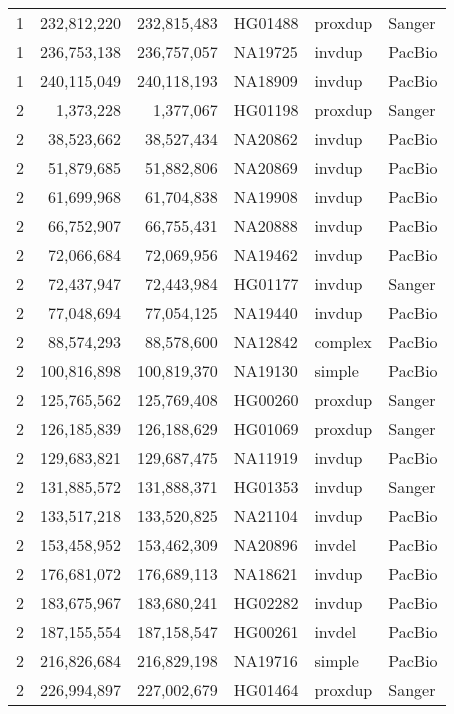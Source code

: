 {\begin{longtable}{rrrlll}
    1   & 232,812,220 & 232,815,483 & HG01488 & proxdup & Sanger  \\
    1   & 236,753,138 & 236,757,057 & NA19725 & invdup  & PacBio  \\
    1   & 240,115,049 & 240,118,193 & NA18909 & invdup  & PacBio  \\
    2   & 1,373,228   & 1,377,067   & HG01198 & proxdup & Sanger  \\
    2   & 38,523,662  & 38,527,434  & NA20862 & invdup  & PacBio  \\
    2   & 51,879,685  & 51,882,806  & NA20869 & invdup  & PacBio  \\
    2   & 61,699,968  & 61,704,838  & NA19908 & invdup  & PacBio  \\
    2   & 66,752,907  & 66,755,431  & NA20888 & invdup  & PacBio  \\
    2   & 72,066,684  & 72,069,956  & NA19462 & invdup  & PacBio  \\
    2   & 72,437,947  & 72,443,984  & HG01177 & invdup  & Sanger  \\
    2   & 77,048,694  & 77,054,125  & NA19440 & invdup  & PacBio  \\
    2   & 88,574,293  & 88,578,600  & NA12842 & complex & PacBio  \\
    2   & 100,816,898 & 100,819,370 & NA19130 & simple  & PacBio  \\
    2   & 125,765,562 & 125,769,408 & HG00260 & proxdup & Sanger  \\
    2   & 126,185,839 & 126,188,629 & HG01069 & proxdup & Sanger  \\
    2   & 129,683,821 & 129,687,475 & NA11919 & invdup  & PacBio  \\
    2   & 131,885,572 & 131,888,371 & HG01353 & invdup  & Sanger  \\
    2   & 133,517,218 & 133,520,825 & NA21104 & invdup  & PacBio  \\
    2   & 153,458,952 & 153,462,309 & NA20896 & invdel  & PacBio  \\
    2   & 176,681,072 & 176,689,113 & NA18621 & invdup  & PacBio  \\
    2   & 183,675,967 & 183,680,241 & HG02282 & invdup  & PacBio  \\
    2   & 187,155,554 & 187,158,547 & HG00261 & invdel  & PacBio  \\
    2   & 216,826,684 & 216,829,198 & NA19716 & simple  & PacBio  \\
    2   & 226,994,897 & 227,002,679 & HG01464 & proxdup & Sanger  \\

\end{longtable}}
